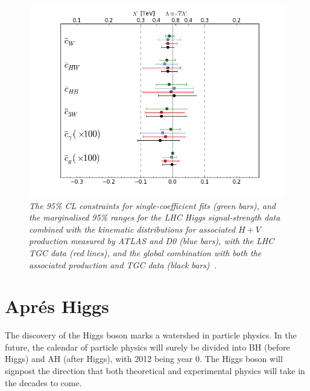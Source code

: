 \documentclass[12pt]{article}
\numberwithin{equation}{section}
\begin{document}
\begin{figure}[h!]
\centering
\includegraphics[scale=0.4]{ESY_Summary95CLbounds.png}
\caption{\it The 95\% CL constraints for single-coefficient fits (green bars),
and the marginalised 95\% ranges for the
LHC Higgs signal-strength data combined with the kinematic distributions for associated $H + V$ production
measured by ATLAS and D0 (blue bars), with the LHC TGC data (red lines), and the global combination with
both the associated production and TGC data (black bars)~\protect\cite{ESY4}.}
\label{fig:dim6}
\end{figure}

\section{Apr\'es Higgs}

The discovery of the Higgs boson marks a watershed in particle physics.
In the future, the calendar of particle physics will surely be divided into BH (before Higgs) and AH (after Higgs), with
2012 being year 0. The Higgs boson will signpost the direction that both theoretical and experimental
physics will take in the decades to come.
\end{document}
